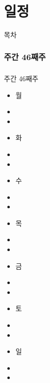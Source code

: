 \documentclass[aspectratio=1610,20pt,xcolor=pdftex,dvipsnames,table,handout]{beamer}
\begin{document}
		\part{일정}
		\frame{\partpage}
		
\label{part2} 	%

		\begin{frame} [plain]{목차}
		\tableofcontents%
		\end{frame}

		\section{주간 
				46째주 }

		\begin{frame} [t,plain]
		\frametitle{}
			\begin{block} {주간 46째주 }
			\setlength{\leftmargini}{1em}			
			\begin{itemize}
				\item 월	\hrulefill
				\item \hrulefill
				\item \hrulefill
				\item 화 \hrulefill
				\item \hrulefill
				\item \hrulefill
				\item 수 \hrulefill
				\item \hrulefill
				\item \hrulefill
				\item 목 \hrulefill
				\item \hrulefill
				\item \hrulefill
				\item 금 \hrulefill
				\item \hrulefill
				\item \hrulefill
				\item 토 \hrulefill
				\item \hrulefill
				\item \hrulefill
				\item 일 \hrulefill
				\item \hrulefill
				\item \hrulefill
			\end{itemize}
			\end{block}			
								
		\end{frame}						
		
\end{document}
